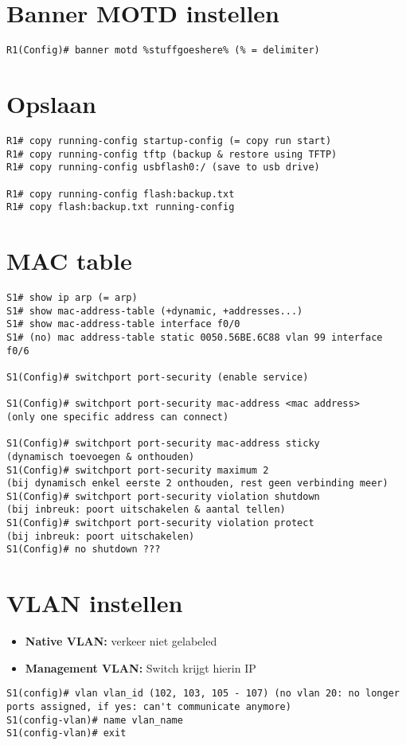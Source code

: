 \documentclass[10pt, a4paper]{article}
\begin{document}
\section{Banner MOTD instellen}
\begin{lstlisting}
R1(Config)# banner motd %stuffgoeshere% (% = delimiter)
\end{lstlisting}

\section{Opslaan}
\begin{lstlisting}
R1# copy running-config startup-config (= copy run start)
R1# copy running-config tftp (backup & restore using TFTP)
R1# copy running-config usbflash0:/ (save to usb drive)

R1# copy running-config flash:backup.txt
R1# copy flash:backup.txt running-config
\end{lstlisting}

\section{MAC table}
\begin{lstlisting}
S1# show ip arp (= arp)
S1# show mac-address-table (+dynamic, +addresses...)
S1# show mac-address-table interface f0/0
S1# (no) mac address-table static 0050.56BE.6C88 vlan 99 interface f0/6

S1(Config)# switchport port-security (enable service)

S1(Config)# switchport port-security mac-address <mac address>
(only one specific address can connect)

S1(Config)# switchport port-security mac-address sticky
(dynamisch toevoegen & onthouden)
S1(Config)# switchport port-security maximum 2
(bij dynamisch enkel eerste 2 onthouden, rest geen verbinding meer)
S1(Config)# switchport port-security violation shutdown
(bij inbreuk: poort uitschakelen & aantal tellen)
S1(Config)# switchport port-security violation protect
(bij inbreuk: poort uitschakelen)
S1(Config)# no shutdown ???
\end{lstlisting}

\section{VLAN instellen}
\begin{itemize}[noitemsep,nolistsep]
\item \textbf{Native VLAN:} verkeer niet gelabeled
\item \textbf{Management VLAN:} Switch krijgt hierin IP\\
\end{itemize}
\begin{lstlisting}
S1(config)# vlan vlan_id (102, 103, 105 - 107) (no vlan 20: no longer ports assigned, if yes: can't communicate anymore)
S1(config-vlan)# name vlan_name
S1(config-vlan)# exit
\end{lstlisting}
\end{document}
